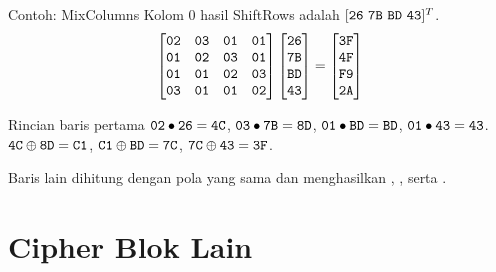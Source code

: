 \documentclass[aspectratio=169,11pt]{beamer}
\begin{document}
\begin{frame}{Contoh: MixColumns}
    \footnotesize
    Kolom 0 hasil ShiftRows adalah $[\texttt{26}\ \texttt{7B}\ \texttt{BD}\
    \texttt{43}]^{T}$.
    \vspace{0.05cm}
    \[
        \begin{bmatrix}
            \texttt{02} & \texttt{03} & \texttt{01} & \texttt{01} \\
            \texttt{01} & \texttt{02} & \texttt{03} & \texttt{01} \\
            \texttt{01} & \texttt{01} & \texttt{02} & \texttt{03} \\
            \texttt{03} & \texttt{01} & \texttt{01} & \texttt{02}
        \end{bmatrix}
        \begin{bmatrix}
            \texttt{26} \\ \texttt{7B} \\ \texttt{BD} \\ \texttt{43}
        \end{bmatrix}
        =
        \begin{bmatrix}
            \texttt{3F} \\ \texttt{4F} \\ \texttt{F9} \\ \texttt{2A}
        \end{bmatrix}
    \]
    \vspace{0.02cm}
    \begin{exampleblock}{Rincian baris pertama}
        \scriptsize
        $\texttt{02} \bullet \texttt{26} = \texttt{4C}$,\quad
        $\texttt{03} \bullet \texttt{7B} = \texttt{8D}$,\quad
        $\texttt{01} \bullet \texttt{BD} = \texttt{BD}$,\quad
        $\texttt{01} \bullet \texttt{43} = \texttt{43}$.\\[2pt]
        $\texttt{4C} \oplus \texttt{8D} = \texttt{C1}$,\quad
        $\texttt{C1} \oplus \texttt{BD} = \texttt{7C}$,\quad
        $\texttt{7C} \oplus \texttt{43} = \texttt{3F}$.
    \end{exampleblock}
    \vspace{0.02cm}
    Baris lain dihitung dengan pola yang sama dan menghasilkan
    , , serta .
\end{frame}

\section{Cipher Blok Lain}
\end{document}
